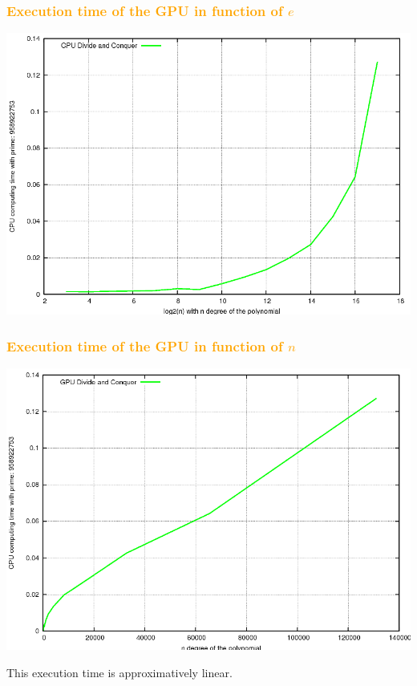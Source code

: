\begin{frame}[fragile]
\frametitle{\textbf{\textcolor{orange}{Execution time of the GPU in function of $e$}}}

\begin{center}
\includegraphics[scale=0.25]{eps/GPUtime_e.png}\\
\end{center}

\end{frame}

\begin{frame}[fragile]
\frametitle{\textbf{\textcolor{orange}{Execution time of the GPU in function of $n$}}}

\begin{center}
\includegraphics[scale=0.25]{eps/GPUtime_n.png}\\
\end{center}

This execution time is approximatively linear.

\end{frame}

